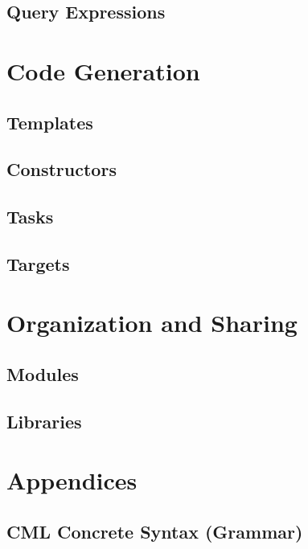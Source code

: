 \documentclass[a4paper,oneside,12pt, extrafontsizes]{memoir}
\theoremstyle{definition}
\theoremstyle{definition}
\theoremstyle{definition}
\theoremstyle{definition}
\begin{document}
\chapter{Query Expressions}
\label{ch:queries}

\part{Code Generation}

\chapter{Templates}
\label{sec:templates}

\chapter{Constructors}
\label{sec:constructors}

\chapter{Tasks}
\label{sec:tasks}

\chapter{Targets}
\label{sec:targets}

\part{Organization and Sharing}

\chapter{Modules}
\label{ch:modules}

\chapter{Libraries}
\label{ch:libraries}

\part{Appendices}

\appendix

\chapter{CML Concrete Syntax (Grammar)}
\label{apx:concrete-syntax}

\end{document}
